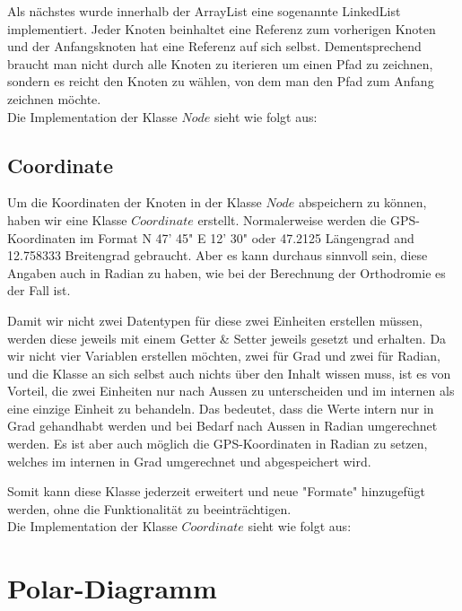 Als nächstes wurde innerhalb der ArrayList eine sogenannte LinkedList implementiert. Jeder Knoten beinhaltet eine Referenz zum vorherigen Knoten und der Anfangsknoten hat eine Referenz auf sich selbst. Dementsprechend braucht man nicht durch alle Knoten zu iterieren um einen Pfad zu zeichnen, sondern es reicht den Knoten zu wählen, von dem man den Pfad zum Anfang zeichnen möchte. \\

Die Implementation der Klasse $Node$ sieht wie folgt aus:



\subsection{Coordinate}
Um die Koordinaten der Knoten in der Klasse $Node$ abspeichern zu können, haben wir eine Klasse $Coordinate$ erstellt. Normalerweise werden die GPS-Koordinaten im Format N 47' 45" E 12' 30" oder 47.2125 Längengrad and 12.758333 Breitengrad gebraucht. Aber es kann durchaus sinnvoll sein, diese Angaben auch in Radian zu haben, wie bei der Berechnung der Orthodromie es der Fall ist. 

Damit wir nicht zwei Datentypen für diese zwei Einheiten erstellen müssen, werden diese jeweils mit einem Getter \& Setter jeweils gesetzt und erhalten. Da wir nicht vier Variablen erstellen möchten, zwei für Grad und zwei für Radian, und die Klasse an sich selbst auch nichts über den Inhalt wissen muss, ist es von Vorteil, die zwei Einheiten nur nach Aussen zu unterscheiden und im internen als eine einzige Einheit zu behandeln. Das bedeutet, dass die Werte intern nur in Grad gehandhabt werden und bei Bedarf nach Aussen in Radian umgerechnet werden. Es ist aber auch möglich die GPS-Koordinaten in Radian zu setzen, welches im internen in Grad umgerechnet und abgespeichert wird. 

Somit kann diese Klasse jederzeit erweitert und neue "Formate" hinzugefügt werden, ohne die Funktionalität zu beeinträchtigen. \\

Die Implementation der Klasse $Coordinate$ sieht wie folgt aus:



\section{Polar-Diagramm}
